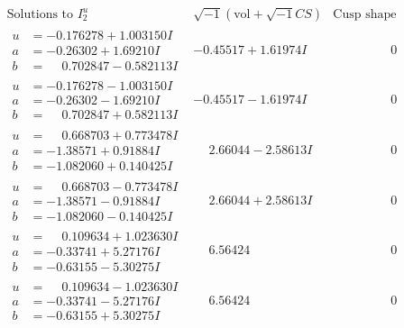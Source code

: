 \documentclass[1p]{elsarticle_modified}
\theoremstyle{definition}
\newcommand{\I}{\sqrt{-1}}
\begin{document}
$$\begin{array}{c|c|c}  
\text{Solutions to }I^u_{2}& \I (\text{vol} + \sqrt{-1}CS) & \text{Cusp shape}\\
 \hline 
\begin{aligned}
u &= -0.176278 + 1.003150 I \\
a &= -0.26302 + 1.69210 I \\
b &= \phantom{-}0.702847 - 0.582113 I\end{aligned}
 & -0.45517 + 1.61974 I & \phantom{-0.000000 } 0 \\ \hline\begin{aligned}
u &= -0.176278 - 1.003150 I \\
a &= -0.26302 - 1.69210 I \\
b &= \phantom{-}0.702847 + 0.582113 I\end{aligned}
 & -0.45517 - 1.61974 I & \phantom{-0.000000 } 0 \\ \hline\begin{aligned}
u &= \phantom{-}0.668703 + 0.773478 I \\
a &= -1.38571 + 0.91884 I \\
b &= -1.082060 + 0.140425 I\end{aligned}
 & \phantom{-}2.66044 - 2.58613 I & \phantom{-0.000000 } 0 \\ \hline\begin{aligned}
u &= \phantom{-}0.668703 - 0.773478 I \\
a &= -1.38571 - 0.91884 I \\
b &= -1.082060 - 0.140425 I\end{aligned}
 & \phantom{-}2.66044 + 2.58613 I & \phantom{-0.000000 } 0 \\ \hline\begin{aligned}
u &= \phantom{-}0.109634 + 1.023630 I \\
a &= -0.33741 + 5.27176 I \\
b &= -0.63155 - 5.30275 I\end{aligned}
 & \phantom{-}6.56424\phantom{ +0.000000I} & \phantom{-0.000000 } 0 \\ \hline\begin{aligned}
u &= \phantom{-}0.109634 - 1.023630 I \\
a &= -0.33741 - 5.27176 I \\
b &= -0.63155 + 5.30275 I\end{aligned}
 & \phantom{-}6.56424\phantom{ +0.000000I} & \phantom{-0.000000 } 0 \\ \hline\begin{aligned}

\end{aligned}
\end{array}$$
\end{document}
